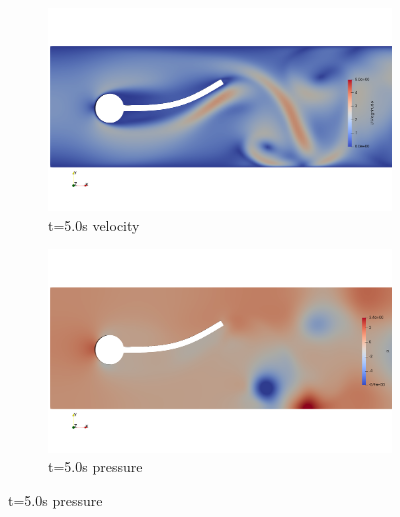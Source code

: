 \begin{figure}[htb]
\centering %
\begin{subfigure}{0.5\textwidth}
  \includegraphics[width=\linewidth, trim=0 120 0 120, clip]{images/FSI2/fsi2_v1.png}
  \caption{t=5.0s velocity}
  \label{fig:fsi2_v1}
\end{subfigure}\hfil %
\begin{subfigure}{0.5\textwidth}
  \includegraphics[width=\linewidth, trim=0 120 0 120, clip]{images/FSI2/fsi2_p1.png}
  \caption{t=5.0s pressure}
  \label{fig:fsi2_p1}
\end{subfigure}\hfil %

\medskip


\end{figure}
